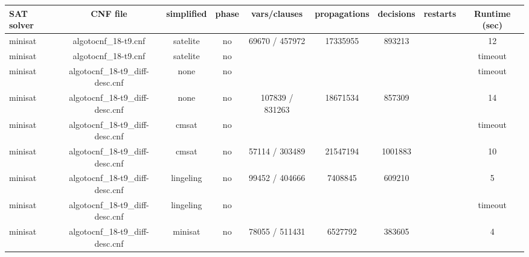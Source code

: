 \begin{appendices}
\begin{table}[p]
  \begin{center}
    \begin{tabular}{l|cccccccc}
        \textbf{SAT solver} & \textbf{CNF file} & \textbf{simplified} & \textbf{phase} & \textbf{vars/clauses} & \textbf{propagations} & \textbf{decisions} & \textbf{restarts} & \textbf{Runtime (sec)} \\
      \hline
  minisat                        & algotocnf\_18-t9.cnf           & satelite   & no    & 69670 / 457972 & 17335955  & 893213    &            & 12 \\ %
  minisat                        & algotocnf\_18-t9.cnf           & satelite   & no    &            &           &           &            & timeout \\ %
  minisat                        & algotocnf\_18-t9\_diff-desc.cnf & none       & no    &            &           &           &            & timeout \\ %
  minisat                        & algotocnf\_18-t9\_diff-desc.cnf & none       & no    & 107839 / 831263 & 18671534  & 857309    &            & 14 \\ %
  minisat                        & algotocnf\_18-t9\_diff-desc.cnf & cmsat      & no    &            &           &           &            & timeout \\ %
  minisat                        & algotocnf\_18-t9\_diff-desc.cnf & cmsat      & no    & 57114 / 303489 & 21547194  & 1001883   &            & 10 \\ %
  minisat                        & algotocnf\_18-t9\_diff-desc.cnf & lingeling  & no    & 99452 / 404666 & 7408845   & 609210    &            & 5 \\ %
  minisat                        & algotocnf\_18-t9\_diff-desc.cnf & lingeling  & no    &            &           &           &            & timeout \\ %
  minisat                        & algotocnf\_18-t9\_diff-desc.cnf & minisat    & no    & 78055 / 511431 & 6527792   & 383605    &            & 4 \\ %

\end{tabular}
\end{center}
\end{table}
\end{appendices}
